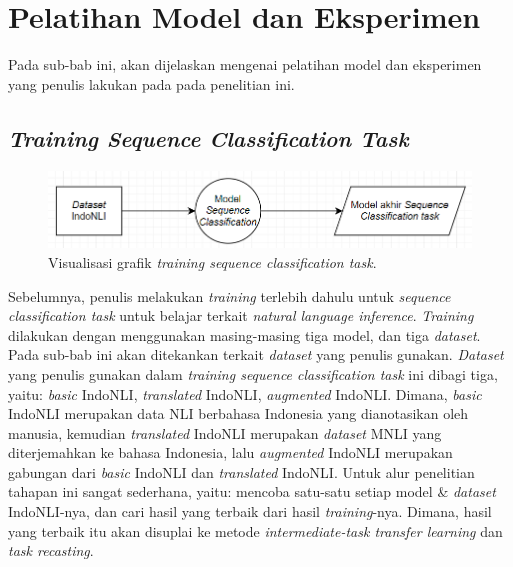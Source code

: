 \section{Pelatihan Model dan Eksperimen}
Pada sub-bab ini, akan dijelaskan mengenai pelatihan model dan eksperimen yang penulis lakukan pada pada penelitian ini. 

\subsection{\emph{Training Sequence Classification Task}}

\begin{figure}[h]
\includegraphics[width=\linewidth]{assets/pics/alur-sc.png}
\centering
\caption{Visualisasi grafik \emph{training sequence classification task}.}
\end{figure}

Sebelumnya, penulis melakukan \emph{training} terlebih dahulu untuk \emph{sequence classification task} untuk belajar terkait \emph{natural language inference}. \emph{Training} dilakukan dengan menggunakan masing-masing tiga model, dan tiga \emph{dataset}. Pada sub-bab ini akan ditekankan terkait \emph{dataset} yang penulis gunakan. \emph{Dataset} yang penulis gunakan dalam \emph{training sequence classification task} ini dibagi tiga, yaitu: \emph{basic} IndoNLI, \emph{translated} IndoNLI, \emph{augmented} IndoNLI. Dimana, \emph{basic} IndoNLI merupakan data NLI berbahasa Indonesia yang dianotasikan oleh manusia, kemudian \emph{translated} IndoNLI merupakan \emph{dataset} MNLI yang diterjemahkan ke bahasa Indonesia, lalu \emph{augmented} IndoNLI merupakan gabungan dari \emph{basic} IndoNLI dan \emph{translated} IndoNLI. Untuk alur penelitian tahapan ini sangat sederhana, yaitu: mencoba satu-satu setiap model \& \emph{dataset} IndoNLI-nya, dan cari hasil yang terbaik dari hasil \emph{training}-nya. Dimana, hasil yang terbaik itu akan disuplai ke metode \emph{intermediate-task transfer learning} dan \emph{task recasting}.

